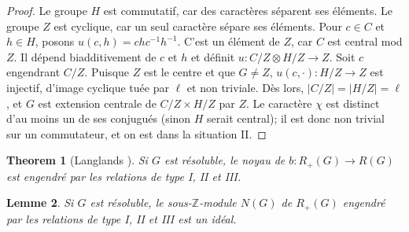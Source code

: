 \documentclass[11pt,a4paper]{amsart}
\theoremstyle{plain}
\newtheorem{theorem}{Theorem}[section]
\newtheorem{lemma}[theorem]{Lemme}
\theoremstyle{definition}
\newcommand{\dbZ}{\mathbb{Z}}
\begin{document}
\begin{proof}
Le groupe $H$ est commutatif, car des caract\`eres s\'eparent ses \'el\'ements. Le groupe $Z$ est cyclique, car un seul caract\`ere s\'epare ses \'el\'ements. Pour $c \in C$ et $h \in H$, posons $u(c,h) = chc^{-1}h^{-1}$. C'est un \'el\'ement de $Z$, car $C$ est central mod $Z$. Il d\'epend biadditivement de $c$ et $h$ et d\'efinit $u: C/Z \otimes H/Z \to Z$. Soit $c$ engendrant $C/Z$. Puisque $Z$ est le centre et que $G \not= Z$, $u(c,\cdot): H/Z \to Z$ est injectif, d'image cyclique tu\'ee par $\ell$ et non triviale. D\`es lors, $|C/Z| = |H/Z| = \ell$, et $G$ est extension centrale de $C/Z \times H/Z$ par $Z$. Le caract\`ere $\chi$ est distinct d'au moins un de ses conjugu\'es (sinon $H$ serait central); il est donc non trivial sur un commutateur, et on est dans la situation II.
\end{proof}

\begin{theorem}[Langlands \cite{9}]\label{thm1.14}
Si $G$ est r\'esoluble, le noyau de $b: R_{+}(G) \to R(G)$ est engendr\'e par les relations de type \textup{I}, \textup{II} et \textup{III}.
\end{theorem}

\begin{lemma}\label{lem1.14.1}
Si $G$ est r\'esoluble, le sous-$\dbZ$-module $N(G)$ de $R_{+}(G)$ engendr\'e par les relations de type \textup{I}, \textup{II} et \textup{III} est un id\'eal.
\end{lemma}
\end{document}
